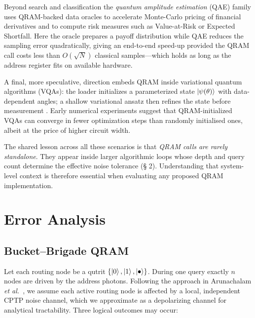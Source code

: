 \documentclass[11pt]{article}
\begin{document}
Beyond search and classification the \emph{quantum amplitude
estimation} (QAE) family uses QRAM-backed data oracles to accelerate
Monte-Carlo pricing of financial derivatives
\cite{Kaneko2020}
and to compute risk measures such as Value-at-Risk or
Expected Shortfall.
Here the oracle prepares a payoff distribution while QAE reduces the
sampling error quadratically, giving an end-to-end speed-up provided the
QRAM call costs less than $O(\sqrt{N})$ classical samples—which
holds as long as the address register fits on available hardware.

A final, more speculative, direction embeds QRAM inside variational
quantum algorithms (VQAs): the loader initializes a parameterized state
$\ket{\psi(\theta)}$ with data-dependent angles;
a shallow variational ansatz then refines the state before measurement
\cite{Gilyen2023}.
Early numerical experiments suggest that QRAM-initialized VQAs can
converge in fewer optimization steps than randomly initialised ones,
albeit at the price of higher circuit width.

The shared lesson across all these scenarios is that \emph{QRAM calls
are rarely standalone}.
They appear inside larger algorithmic loops whose depth and query count
determine the effective noise tolerance (§ 2).
Understanding that system-level context is therefore essential when
evaluating any proposed QRAM implementation.

\section{Error Analysis}

\subsection{Bucket--Brigade QRAM}
\label{ssec:bbqram}

Let each routing node be a qutrit
\(\{\ket{0},\ket{1},\ket{\bullet}\}\).
During one query exactly \(n\) nodes are driven by the address photons.
Following the approach in Arunachalam \emph{et al.}~\cite{Arunachalam2015}, we assume each active routing node is affected by a local, independent CPTP noise channel, which we approximate as a depolarizing channel for analytical tractability.
Three logical outcomes may occur:
\end{document}
